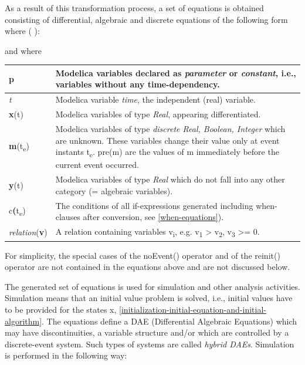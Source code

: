 \documentclass[10pt,a4paper]{report}
\begin{document}
As a result of this transformation process, a set of equations is
obtained consisting of differential, algebraic and discrete equations of
the following form where ( ):

and where

\begin{longtable}[]{|p{2cm}|p{12cm}|}
\hline \endhead
\textbf{p} & Modelica variables declared as \emph{parameter} or
\emph{constant}, i.e., variables without any
time-dependency.\\ \hline
\emph{t} & Modelica variable \emph{time}, the independent (real)
variable.\\ \hline
\textbf{x}(t) & Modelica variables of type \emph{Real}, appearing
differentiated.\\ \hline
\textbf{m}(t\textsubscript{e}) & Modelica variables of type
\emph{discrete Real, Boolean, Integer} which are unknown. These
variables change their value only at event instants t\textsubscript{e}.
pre(m) are the values of m immediately before the current event
occurred.\\ \hline
\textbf{y}(t) & Modelica variables of type \emph{Real} which do not fall
into any other category (= algebraic variables).\\ \hline
c\textbf{(}t\textsubscript{e}) & The conditions of all if-expressions
generated including when-clauses after conversion, see \ref{when-equations}).\\ \hline
\emph{relation}(\textbf{v}) & A relation containing variables
v\textsubscript{i}, e.g. v\textsubscript{1} \textgreater{}
v\textsubscript{2}, v\textsubscript{3} \textgreater{}= 0.\\ \hline

\end{longtable}

For simplicity, the special cases of the noEvent() operator and of the
reinit() operator are not contained in the equations above and are not
discussed below.

The generated set of equations is used for simulation and other analysis
activities. Simulation means that an initial value problem is solved,
i.e., initial values have to be provided for the states x, \ref{initialization-initial-equation-and-initial-algorithm}.
The equations define a DAE (Differential Algebraic Equations) which may
have discontinuities, a variable structure and/or which are controlled
by a discrete-event system. Such types of systems are called
\emph{hybrid DAEs}. Simulation is performed in the following way:
\end{document}

